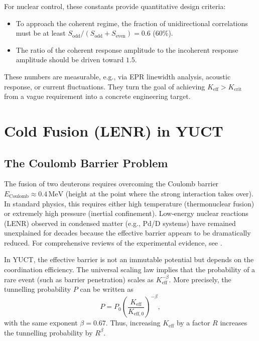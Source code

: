 \documentclass[12pt]{article}
\theoremstyle{remark}
\newcommand{\Keff}{K_{\mathrm{eff}}}
\newcommand{\Keffzero}{K_{\mathrm{eff},0}}
\newcommand{\Kcrit}{K_{\mathrm{crit}}}
\newcommand{\Sodd}{S_{\mathrm{odd}}}
\newcommand{\Seven}{S_{\mathrm{even}}}
\begin{document}
	For nuclear control, these constants provide quantitative design criteria:
	\begin{itemize}
		\item To approach the coherent regime, the fraction of unidirectional correlations must be at least \(\Sodd/(\Sodd+\Seven)=0.6\) (60\%).
		\item The ratio of the coherent response amplitude to the incoherent response amplitude should be driven toward \(1.5\).
	\end{itemize}
	These numbers are measurable, e.g., via EPR linewidth analysis, acoustic response, or current fluctuations. They turn the goal of achieving \(\Keff > \Kcrit\) from a vague requirement into a concrete engineering target.
	
	\section{Cold Fusion (LENR) in YUCT}
	\label{sec:fusion}
	
	\subsection{The Coulomb Barrier Problem}
	
	The fusion of two deuterons requires overcoming the Coulomb barrier \(E_{\text{Coulomb}} \approx 0.4\,\text{MeV}\) (height at the point where the strong interaction takes over). In standard physics, this requires either high temperature (thermonuclear fusion) or extremely high pressure (inertial confinement). Low‑energy nuclear reactions (LENR) observed in condensed matter (e.g., Pd/D systems) have remained unexplained for decades because the effective barrier appears to be dramatically reduced. For comprehensive reviews of the experimental evidence, see \cite{Storms2014, Nagel2019}.
	
	In YUCT, the effective barrier is not an immutable potential but depends on the coordination efficiency. The universal scaling law implies that the probability of a rare event (such as barrier penetration) scales as \(\Keff^{-\beta}\). More precisely, the tunnelling probability \(P\) can be written as
	\begin{equation}
		P = P_0 \left( \frac{\Keff}{\Keffzero} \right)^{-\beta},
		\label{eq:tunnel}
	\end{equation}
	with the same exponent \(\beta = 0.67\). Thus, increasing \(\Keff\) by a factor \(R\) increases the tunnelling probability by \(R^{\beta}\).
	
\end{document}
